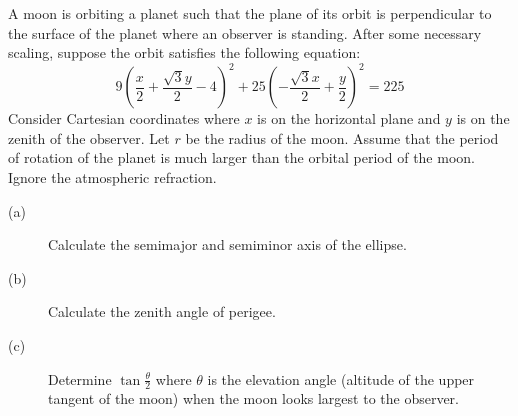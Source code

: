 A moon is orbiting a planet such that the plane of its orbit is perpendicular
to the surface of the planet where an observer is standing. After some
necessary scaling, suppose the orbit satisfies the following equation:
\[ 9\left(\frac{x}{2} + \frac{\sqrt{3}y}{2} - 4\right)^2
   + 25\left(-\frac{\sqrt{3}x}{2} + \frac{y}{2}\right)^2 = 225 \]
Consider Cartesian coordinates where $x$ is on the horizontal plane and $y$ is
on the zenith of the observer. Let $r$ be the radius of the moon. Assume that
the period of rotation of the planet is much larger than the orbital period of
the moon. Ignore the atmospheric refraction.

\begin{description}
\item[(a)] Calculate the semimajor and semiminor axis of the ellipse.
\item[(b)] Calculate the zenith angle of perigee.
\item[(c)] Determine $\tan\frac{\theta}{2}$ where $\theta$ is the elevation
  angle (altitude of the upper tangent of the moon) when the moon looks
  largest to the observer.
\end{description}
